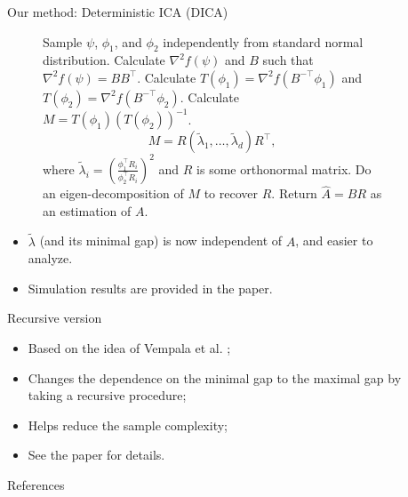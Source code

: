 \documentclass[final]{beamer} %
\begin{document}
\begin{frame}[c]
\begin{columns}[t,totalwidth=\textwidth]
	\begin{column}{0.01\textwidth}
	\end{column}
	\begin{column}{0.24\textwidth}
		\begin{block}{Our method: Deterministic ICA (DICA)}		
			\begin{figure}
			\begin{algorithmic}[1]
				\STATE Sample $\psi$, $\phi_1$, and $\phi_2$ independently from standard normal distribution.
				\STATE Calculate $\nabla^2 f(\psi)$ and $B$ such that $\nabla^2 f(\psi) = BB^{\top}$.
				\STATE Calculate $T(\phi_1) = \nabla^2 f(B^{-\top}\phi_1)$ and $T(\phi_2) = \nabla^2 f(B^{-\top}\phi_2)$.
				\STATE Calculate $M = T(\phi_1)(T(\phi_2))^{-1}$.
					\[
					M = R \left( \tilde{\lambda}_1, \ldots, \tilde{\lambda}_d \right)R^{\top},
					\]
					where $\tilde{\lambda}_i = \left(\frac{\phi_1^{\top}R_i}{\phi_2^{\top}R_i}\right)^2$ and $R$ is some orthonormal matrix.
				\STATE Do an eigen-decomposition of $M$ to recover $R$.
				\STATE Return $\hat{A} = BR$ as an estimation of $A$. 
			\end{algorithmic}
			\end{figure}
			\begin{itemize}
				\item $\tilde{\lambda}$ (and its minimal gap) is now independent of $A$, and easier to analyze.
				\item Simulation results are provided in the paper.
			\end{itemize}
		\end{block}
		\vspace{0.5ex}
		\begin{block}{Recursive version}
			\begin{itemize}
				\item Based on the idea of Vempala et al. \citep{vempala2014max};
				\item Changes the dependence on the minimal gap to the maximal gap by taking a recursive procedure;
				\item Helps reduce the sample complexity;
				\item See the paper for details.
			\end{itemize}
		\end{block}
		\begin{block}{References}
			\scriptsize
			
			
		\end{block}			
	\end{column}
		
	\begin{column}{0.01\textwidth}
	\end{column}
\end{columns}
 
\end{frame}
\end{document}
